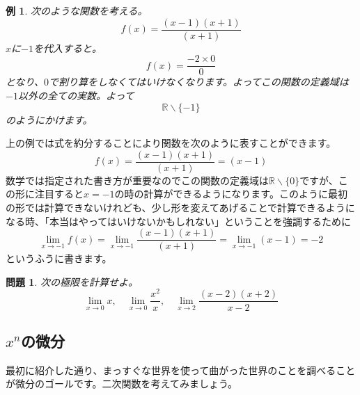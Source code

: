 \documentclass{ltjsarticle}
\newtheorem{problem}{問題}
\newtheorem{example}{例}[section]
\newcommand*{\R}{\mathbb{R}}
\begin{document}
\begin{example}
次のような関数を考える。
\begin{equation*}
f(x) = {\frac {(x-1)(x+1)} {(x+1)}}
\end{equation*}
$x$に$-1$を代入すると。
\begin{equation*}
f(x) = {\frac {-2\times 0} {0}}
\end{equation*}
となり、$0$で割り算をしなくてはいけなくなります。よってこの関数の定義域は$-1$以外の全ての実数。よって
\begin{equation*}
\R\backslash\{-1\}
\end{equation*}
のようにかけます。
\end{example}

上の例では式を約分することにより関数を次のように表すことができます。
\begin{equation*}
f(x) = {\frac {(x-1)(x+1)} {(x+1)}}=(x-1)
\end{equation*}
数学では指定された書き方が重要なのでこの関数の定義域は$\R\backslash\{0\}$ですが、この形に注目すると$x=-1$の時の計算ができるようになります。このように最初の形では計算できないけれども、少し形を変えてあげることで計算できるようになる時、「本当はやってはいけないかもしれない」ということを強調するために
\begin{equation*}
\lim_{x\to-1}f(x) = \lim_{x\to-1}{\frac {(x-1)(x+1)} {(x+1)}} =\lim_{x\to-1}(x-1)= -2
\end{equation*}
というふうに書きます。

\begin{problem}
次の極限を計算せよ。
\begin{equation*}
\lim_{x\to 0} x, \quad\lim_{x\to 0} {\frac {x^2} x}, \quad\lim_{x\to 2} {\frac {(x-2)(x+2)}{x-2}}
\end{equation*}
\end{problem}

\subsection{$x^n$の微分}

最初に紹介した通り、まっすぐな世界を使って曲がった世界のことを調べることが微分のゴールです。二次関数を考えてみましょう。
\begin{center}
\end{center}
\end{document}

